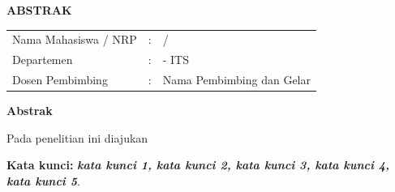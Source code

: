 {\parskip=0pt\centering\large\textbf{ABSTRAK}\par}

\vspace{3ex}

{\parskip=0pt\centering\textbf{\tatitle{}}\par}
\vspace{\baselineskip}

\begingroup
\setlength{\tabcolsep}{0pt}

\bfseries
\begin{tabularx}{\textwidth}{l >{\centering}m{2em} X}
  Nama Mahasiswa / NRP & : & \name{} / \nrp{} \\[1ex]
  Departemen           & : & \department{} \facultyshort{} - ITS \\[1ex]
  Dosen Pembimbing     & : & Nama Pembimbing dan Gelar \\
\end{tabularx}
\endgroup
\vspace{\baselineskip}

\paragraphtextstyle

\noindent\textbf{Abstrak}

Pada penelitian ini diajukan \lipsum[1]

\vspace{\baselineskip}

\noindent\textbf{Kata kunci:} \textbf{\textit{kata kunci 1, kata kunci 2, kata kunci 3, kata kunci 4, kata kunci 5}}.

